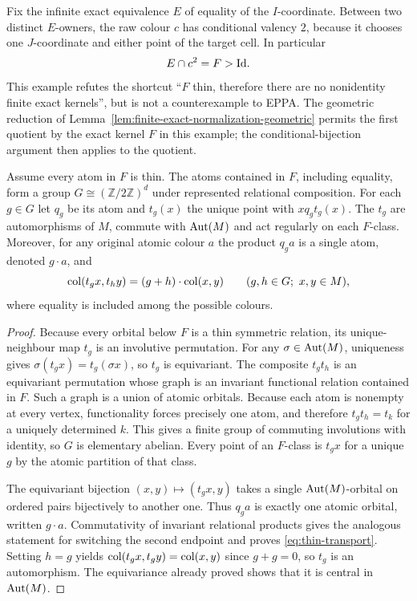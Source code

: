 \begin{example}
Fix the infinite exact equivalence $E$ of equality of the
$I$-coordinate.  Between two distinct $E$-owners, the raw colour
$c$ has conditional valency $2$, because it chooses one $J$-coordinate
and either point of the target cell.  In particular
\[
                     E\cap c^2=F>\mathrm{Id}.
\]
This example refutes the shortcut ``$F$ thin, therefore there are no
nonidentity finite exact kernels'', but is not a counterexample to
EPPA.  The geometric reduction of Lemma~\ref{lem:finite-exact-normalization-geometric}
permits the first quotient by the exact kernel $F$ in this example;
the conditional-bijection argument then applies to the quotient.
\end{example}

\begin{lemma}
\label{lem:thin-bottom}
Assume every atom in $F$ is thin.  The atoms contained in $F$,
including equality, form a group $G\cong (\mathbb Z/2\mathbb Z)^d$
under represented relational composition.  For each $g\in G$
let $q_g$ be its atom and $t_g(x)$ the unique point with
$x\mathrel{q_g} t_g(x)$.  The $t_g$ are automorphisms of $M$,
commute with $\operatorname{Aut}(M)$ and act regularly on each $F$-class.
Moreover, for any original atomic colour $a$ the product $q_ga$
is a single atom, denoted $g\cdot a$, and
\begin{equation}\label{eq:thin-transport}
 \operatorname{col}(t_gx,t_hy)=(g+h)\cdot\operatorname{col}(x,y)
 \qquad(g,h\in G;\ x,y\in M),
\end{equation}
where equality is included among the possible colours.
\end{lemma}
\begin{proof}
Because every orbital below $F$ is a thin symmetric relation,
its unique-neighbour map $t_g$ is an involutive permutation.
For any $\sigma\in\operatorname{Aut}(M)$, uniqueness gives
$\sigma(t_gx)=t_g(\sigma x)$, so $t_g$ is equivariant.
The composite $t_gt_h$ is an equivariant permutation whose graph
is an invariant functional relation contained in $F$.  Such a
graph is a union of atomic orbitals.  Because each atom is
nonempty at every vertex, functionality forces precisely one
atom, and therefore $t_gt_h=t_k$ for a uniquely determined $k$.
This gives a finite group of commuting involutions with identity,
so $G$ is elementary abelian.  Every point of an $F$-class is
$t_gx$ for a unique $g$ by the atomic partition of that class.

The equivariant bijection $(x,y)\mapsto(t_gx,y)$ takes a single
$\operatorname{Aut}(M)$-orbital on ordered pairs bijectively to another one.
Thus $q_ga$ is exactly one atomic orbital, written $g\cdot a$.
Commutativity of invariant relational products gives the analogous
statement for switching the second endpoint and proves
\eqref{eq:thin-transport}.  Setting $h=g$ yields
$\operatorname{col}(t_gx,t_gy)=\operatorname{col}(x,y)$ since $g+g=0$,
so $t_g$ is an automorphism.  The equivariance already proved
shows that it is central in $\operatorname{Aut}(M)$.
\end{proof}

